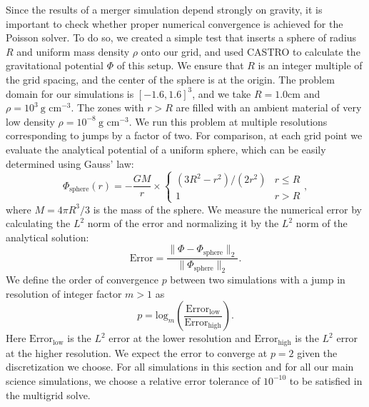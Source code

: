 \documentclass{emulateapj}
\begin{document}
Since the results of a merger simulation depend strongly on gravity,
it is important to check whether proper numerical convergence is
achieved for the Poisson solver. To do so, we created a simple test
that inserts a sphere of radius $R$ and uniform mass density $\rho$
onto our grid, and used CASTRO to calculate the gravitational
potential $\Phi$ of this setup. We ensure that $R$ is an integer
multiple of the grid spacing, and the center of the sphere is at the
origin. The problem domain for our simulations is $[-1.6, 1.6]^3$, and
we take $R = 1.0 \text{cm}$ and $\rho = 10^3\ \text{g cm}^{-3}$. 
The zones with $r > R$ are filled with an ambient material of very low density 
$\rho = 10^{-8}\ \text{g cm}^{-3}$. We run this problem at multiple 
resolutions corresponding to jumps by a factor of two. For
comparison, at each grid point we evaluate the analytical potential of
a uniform sphere, which can be easily determined using Gauss' law:
\begin{equation}
  \Phi_{\text{sphere}}(r) = -\frac{GM}{r} \times \begin{cases} (3R^2 - r^2)/(2 r^2) & r \leq R \\ 1 & r > R \end{cases},\label{eq:sphere-analytical}
\end{equation}
where $M = 4\pi R^3 / 3$ is the mass of the sphere. We measure the 
numerical error by calculating the $L^2$ norm of the error and 
normalizing it by the $L^2$ norm of the analytical solution:
\begin{equation}
  \text{Error} = \frac{\|\Phi - \Phi_{\text{sphere}}\|_2}{\|\Phi_{\text{sphere}}\|_2}.
\end{equation}
We define the order of convergence $p$ between two simulations with a jump 
in resolution of integer factor $m > 1$ as
\begin{equation}
  p = \text{log}_{m}\left(\frac{\text{Error}_{\text{low}}}{\text{Error}_{\text{high}}}\right).
\end{equation}
Here $\text{Error}_{\text{low}}$ is the $L^2$ error at the lower resolution 
and $\text{Error}_{\text{high}}$ is the $L^2$ error at the higher resolution.
We expect the error to converge at $p = 2$ given the discretization we choose. 
For all simulations in this section and for all our main science simulations,
we choose a relative error tolerance of $10^{-10}$ to be satisfied in the multigrid solve.
\end{document}
